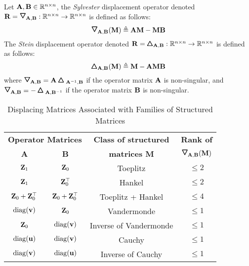 \begin{definition}
  Let $\mathbf{A}, \mathbf{B} \in \mathbb{R}^{n \times n}$, the \emph{Sylvester} displacement operator denoted $\Rmat = \triangleopdown_{\Amat, \Bmat}: \Rbb^{n \times n} \rightarrow \Rbb^{n \times n}$ is defined as follows:
  \begin{equation}
    \triangleopdown_{\Amat, \Bmat} (\Mmat) \triangleq \Amat \Mmat - \Mmat \Bmat
  \end{equation}
  The \emph{Stein} displacement operator denoted $\mathbf{R} = \pmb{\bigtriangleup}_{\mathbf{A}, \mathbf{B}}: \mathbb{R}^{n \times n} \rightarrow \mathbb{R}^{n \times n}$ is defined as follows:
  \begin{equation}
    \pmb{\bigtriangleup}_{\mathbf{A}, \mathbf{B}} (\mathbf{M}) \triangleq \mathbf{M} - \mathbf{A} \mathbf{M} \mathbf{B}
  \end{equation}
  where $\triangleopdown_{\Amat, \Bmat} = \Amat \triangleopup_{\Amat^{-1}, \Bmat}$ if the operator matrix $\mathbf{A}$ is non-singular, and $\triangleopdown_{\Amat, \Bmat} = -\triangleopup_{\Amat, \Bmat^{-1}}$ if the operator matrix $\mathbf{B}$ is non-singular.
\end{definition}
\begin{table}[t]
  \centering
  {\small
  \begin{tabular}{c|c|c|c}
    \toprule
    \multicolumn{2}{c|}{\textbf{Operator Matrices}} & \textbf{Class of structured} & \textbf{Rank of } \\
    \textbf{A} & \textbf{B} & \textbf{matrices M} & $\triangleopdown_{\Amat, \Bmat}(\Mmat)$ \\
    \midrule
    $\mathbf{Z}_1$                & $\mathbf{Z}_0$                & Toeplitz               & $\leq 2$ \\
    $\mathbf{Z}_1$                & $\mathbf{Z}_0^\top$           & Hankel                 & $\leq 2$ \\
    $\mathbf{Z}_0 + \mathbf{Z}_0^\top$ & $\mathbf{Z}_0 + \mathbf{Z}_0^\top$ & Toeplitz + Hankel      & $\leq 4$ \\
    $\operatorname*{diag}(\mathbf{v})$           & $\mathbf{Z}_0$                & Vandermonde            & $\leq 1$ \\
    $\mathbf{Z}_0$                & $\operatorname*{diag}(\mathbf{v})$           & Inverse of Vandermonde & $\leq 1$ \\
    $\operatorname*{diag}(\mathbf{u})$           & $\operatorname*{diag}(\mathbf{v})$           & Cauchy                 & $\leq 1$ \\
    $\operatorname*{diag}(\mathbf{v})$           & $\operatorname*{diag}(\mathbf{u})$           & Inverse of Cauchy      & $\leq 1$ \\
    \bottomrule
  \end{tabular}
  }
  \caption{Displacing Matrices Associated with Families of Structured Matrices \cite{pan2001structured}}
  \label{table:ch2-displacing_matrices}
  \vspace{0.5cm}
\end{table}

